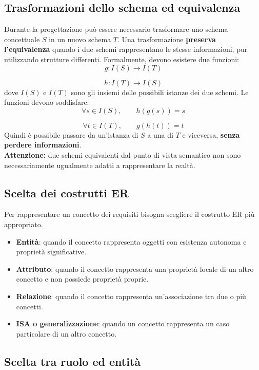 \subsection*{Trasformazioni dello schema ed equivalenza}

Durante la progettazione può essere necessario
trasformare uno schema concettuale $S$
in un nuovo schema $T$.
Una trasformazione \textbf{preserva l'equivalenza}
quando i due schemi rappresentano
le stesse informazioni, pur utilizzando
strutture differenti.
Formalmente, devono esistere due funzioni:
\[
g : I(S) \rightarrow I(T)
\]

\[
h : I(T) \rightarrow I(S)
\]
dove $I(S)$ e $I(T)$ sono gli insiemi
delle possibili istanze dei due schemi.
Le funzioni devono soddisfare:
\[
\forall s \in I(S), \qquad h(g(s)) = s
\]

\[
\forall t \in I(T), \qquad g(h(t)) = t
\]
Quindi è possibile passare da un'istanza
di $S$ a una di $T$ e viceversa,
\textbf{senza perdere informazioni}.\\
\textbf{Attenzione:}
due schemi equivalenti dal punto di vista semantico
non sono necessariamente ugualmente adatti
a rappresentare la realtà.


\subsection{Scelta dei costrutti ER}

Per rappresentare un concetto dei requisiti
bisogna scegliere il costrutto ER più appropriato.

\begin{itemize}
    \item \textbf{Entità}: quando il concetto
    rappresenta oggetti con esistenza autonoma
    e proprietà significative.

    \item \textbf{Attributo}: quando il concetto
    rappresenta una proprietà locale di un altro
    concetto e non possiede proprietà proprie.

    \item \textbf{Relazione}: quando il concetto
    rappresenta un'associazione tra due o più concetti.

    \item \textbf{ISA o generalizzazione}: quando
    un concetto rappresenta un caso particolare
    di un altro concetto.
\end{itemize}


\subsection*{Scelta tra ruolo ed entità}

